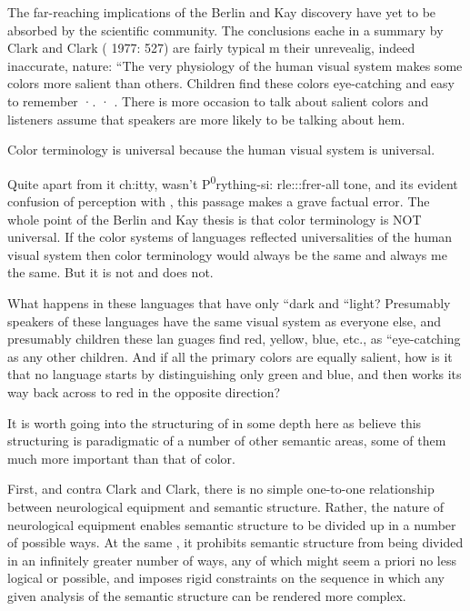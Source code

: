 The far-reaching implications of the Berlin and Kay discovery have yet to be absorbed by the scientific community. The conclusions eache in a summary by Clark and Clark ( 1977: 527) are fairly typical m their unrevealig, indeed inaccurate, nature: ``The very physiology of the human visual system makes some colors more salient than others. Children find these colors eye-catching and easy to remem\-ber ·. · . There is more occasion to talk about salient colors and listeners assume that speakers are more likely to be talking about hem.

Color terminology is universal because the human visual system is universal.{\textquotedbl}

Quite apart from it ch:itty, wasn't P{\textquotedbl}\textsuperscript{0}rything-si: rle:::frer-all tone, and its evident confusion of perception with , this passage makes a grave factual error. The whole point of the Berlin and Kay thesis is that color terminology is NOT universal. If the color systems of languages reflected universalities of the human visual system
then color terminology would always be the same and always me the same. But it is not and does not.

What happens in these languages that have only ``dark and ``light{\textquotedbl}? Presumably speakers of these languages have the same visual system as everyone else, and presumably children  these lan%
guages find red, yellow, blue, etc., as ``eye-catching as any other children. And if all the primary colors are equally salient, how is it that no language starts by distinguishing only green and blue, and then works its way back across to red in the opposite direction?

It is worth going into the structuring of  in some depth here as  believe this structuring is paradigmatic of a number of other semantic areas, some of them much more important than that of color.

First, and contra Clark and Clark, there is no simple one-to-one relationship between neurological equipment and semantic structure. Rather, the nature of neurological equipment enables semantic struc\-ture to be divided up in a number of possible ways. At the same , it prohibits semantic structure from being divided in an infinitely greater number of ways, any of which might seem a priori no less logical or possible, and imposes rigid constraints on the sequence in which any given analysis of the semantic structure can be rendered more complex.


